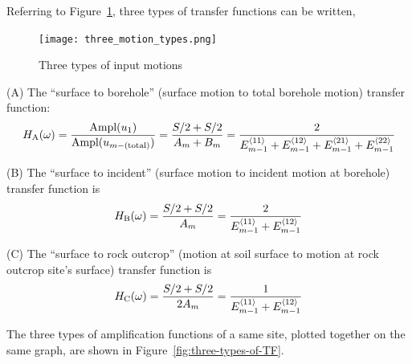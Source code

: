 \documentclass[11pt,letterpaper]{article}
\begin{document}
Referring to Figure~\ref{fig:three-types-of-input-motions}, three types of transfer functions can be written,


\begin{figure}[h]
    \centering
  \texttt{[image: three\_motion\_types.png]}\\
  \caption{Three types of input motions}\label{fig:three-types-of-input-motions}
\end{figure}

\textsf{(A)} The ``surface to borehole'' (surface motion to total borehole motion) transfer function:
\begin{equation}
H_{\text{A}}(\omega)  = \displaystyle\frac{\text{Ampl}(u_1)}{\text{Ampl}(u_{m-\text{(total)}})} = \frac{S/2 + S/2}{A_m+B_m} = \frac{2}{E_{m-1}^{\langle 11\rangle} + E_{m-1}^{\langle 12\rangle}+E_{m-1}^{\langle 21\rangle} + E_{m-1}^{\langle 22\rangle}}
\end{equation}

\textsf{(B)} The ``surface to incident'' (surface motion to incident motion at borehole) transfer function is
\begin{equation}
H_{\text{B}}(\omega) = \frac{S/2+S/2}{A_m} =\frac{2}{E_{m-1}^{\langle 11\rangle} + E_{m-1}^{\langle 12\rangle}}
\end{equation}

\textsf{(C)} The ``surface to rock outcrop'' (motion at soil surface to motion at rock outcrop site's surface) transfer function is
\begin{equation}
H_{\text{C}}(\omega) = \frac{S/2+S/2}{2A_m} = \frac{1}{E_{m-1}^{\langle 11\rangle} + E_{m-1}^{\langle 12\rangle}}
\end{equation}

The three types of amplification functions of a same site, plotted together on the same graph, are shown in Figure~\ref{fig:three-types-of-TF}.
\end{document}
